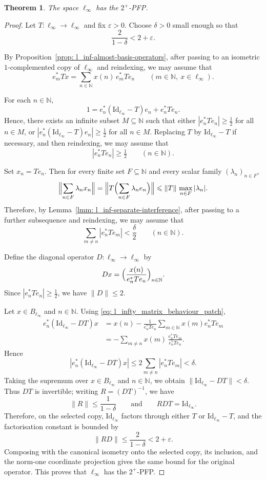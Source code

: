 \documentclass[11pt]{amsart}
\theoremstyle{plain}
\newtheorem{theorem}{Theorem}[section]
\theoremstyle{definition}
\numberwithin{equation}{section}
\newcommand{\norm}[1]{\lVert #1 \rVert}
\newcommand{\N}{\mathbb{N}}
\newcommand{\Id}{\mathrm{Id}}
\renewcommand{\le}{\leqslant}
\renewcommand{\ge}{\geqslant}
\begin{document}
\begin{theorem}\label{th: UPFP_l_infty}
    The space $\ell_\infty$ has the $2^+$-PFP.
\end{theorem}
\begin{proof}
Let $T\colon \ell_\infty\to \ell_\infty$ and fix $\varepsilon>0$.
Choose $\delta>0$ small enough so that
\[
\frac{2}{1-\delta}<2+\varepsilon.
\]

By Proposition~\ref{prop: l_inf-almost-basis-operators}, after passing to an isometric $1$-complemented copy of $\ell_\infty$ and reindexing, we may assume that
\begin{equation}\label{eq: l_infty_matrix_behaviour_patch}
    e_m^*Tx = \sum_{n\in\N} x(n)\,e_m^*Te_n
    \qquad(m\in\N,\ x\in\ell_\infty).
\end{equation}

For each $n\in\N$,
\[
1=e_n^*(\Id_{\ell_\infty}-T)e_n+e_n^*Te_n.
\]
Hence, there exists an infinite subset $M\subseteq\N$ such that either
$|e_n^*Te_n|\ge \tfrac12$ for all $n\in M$, or
$|e_n^*(\Id_{\ell_\infty}-T)e_n|\ge \tfrac12$ for all $n\in M$.
Replacing $T$ by $\Id_{\ell_\infty}-T$ if necessary, and then reindexing, we may assume that
\[
|e_n^*Te_n|\ge \tfrac12
\qquad(n\in\N).
\]

Set $x_n=Te_n$. Then for every finite set $F\subseteq\N$ and every scalar family $(\lambda_n)_{n\in F}$,
\[
\Bigl\|\sum_{n\in F} \lambda_n x_n\Bigr\|
= \Bigl\|T\Bigl(\sum_{n\in F} \lambda_n e_n\Bigr)\Bigr\|
\le \norm{T}\,\max_{n\in F}|\lambda_n|.
\]
Therefore, by Lemma~\ref{lmm: l_inf-separate-interference}, after passing to a further subsequence and reindexing, we may assume that
\[
\sum_{m\neq n}|e_n^*Te_m|<\frac{\delta}{2}
\qquad(n\in\N).
\]

Define the diagonal operator $D\colon \ell_\infty\to\ell_\infty$ by
\[
Dx=\Bigl(\frac{x(n)}{e_n^*Te_n}\Bigr)_{n\in\N}.
\]
Since $|e_n^*Te_n|\ge \tfrac12$, we have $\norm{D}\le 2$.

Let $x\in B_{\ell_\infty}$ and $n\in\N$. Using \eqref{eq: l_infty_matrix_behaviour_patch},
\begin{align*}
 e_n^*(\Id_{\ell_\infty}-DT)x
 &= x(n)-\frac{1}{e_n^*Te_n}\sum_{m\in\N}x(m)e_n^*Te_m \\
 &= -\sum_{m\neq n}x(m)\,\frac{e_n^*Te_m}{e_n^*Te_n}.
\end{align*}
Hence
\[
|e_n^*(\Id_{\ell_\infty}-DT)x|
\le 2\sum_{m\neq n}|e_n^*Te_m|
<\delta.
\]
Taking the supremum over $x\in B_{\ell_\infty}$ and $n\in\N$, we obtain
\(
\norm{\Id_{\ell_\infty}-DT}<\delta.
\)
Thus $DT$ is invertible; writing $R=(DT)^{-1}$, we have
\[
\norm{R}\le \frac{1}{1-\delta}
\qquad\text{and}\qquad
RDT=\Id_{\ell_\infty}.
\]
Therefore, on the selected copy, $\Id_{\ell_\infty}$ factors through either $T$ or $\Id_{\ell_\infty}-T$, and the factorisation constant is bounded by
\[
\norm{RD}\le \frac{2}{1-\delta}<2+\varepsilon.
\]
Composing with the canonical isometry onto the selected copy, its inclusion, and the norm-one coordinate projection gives the same bound for the original operator. This proves that $\ell_\infty$ has the $2^+$-PFP.
\end{proof}
\end{document}

